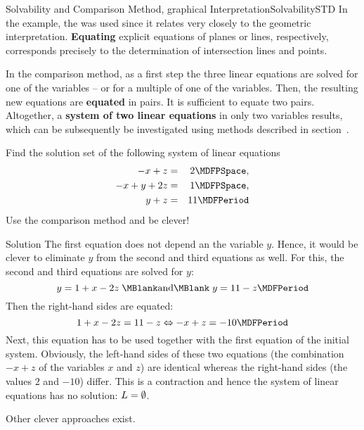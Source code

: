 \begin{MXContent}{Solvability and Comparison Method, graphical Interpretation}{Solvability}{STD}
In the example, the 
was used since it relates very closely to the geometric interpretation. \textbf{Equating}
explicit equations of planes or lines, respectively, corresponds precisely to the determination
of intersection lines and points.
 
\begin{MInfo}
In the comparison method, as a first step the three linear equations are solved for 
one of the variables -- or for a multiple of one of the variables. Then, the resulting 
new equations are \textbf{equated} in pairs. It is sufficient to equate two pairs.  
Altogether, a \textbf{system of two linear equations} in only two variables results,
which can be subsequently be investigated using methods described in 
section~.
\end{MInfo}

\begin{MExercise}
Find the solution set of the following system of linear equations
\begin{eqnarray*}
- x + z & = & 2 \MDFPSpace, \\ - x + y + 2 z & = & 1 \MDFPSpace, \\ y + z & = & 11 \MDFPeriod
\end{eqnarray*}
Use the comparison method and be clever!

\begin{MHint}{Solution}
The first equation does not depend an the variable $y$. Hence, it would
be clever to eliminate $y$ from the second and third equations as well. 
For this, the second and third equations are solved for $y$:
$$y = 1 + x - 2 z \; \MBlank\mbox{and}\MBlank \; y = 11 - z \MDFPeriod $$
Then the right-hand sides are equated:
$$1 + x - 2 z = 11 - z \Leftrightarrow - x + z = - 10 \MDFPeriod $$
Next, this equation has to be used together with the first equation of the initial system. 
Obviously, the left-hand sides of these two equations (the combination $- x + z$ of 
the variables $x$ and $z$) are identical whereas the right-hand sides 
(the values $2$ and $-10$) differ. This is a contraction and hence the system
of linear equations has no solution: ${L} = \emptyset$.

Other clever approaches exist.
\end{MHint}
\end{MExercise}
\end{MXContent}

